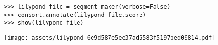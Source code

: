 \begin{comment}
<abjad>[stylesheet=../consort.ily]
lilypond_file = segment_maker(verbose=False)
consort.annotate(lilypond_file.score)
show(lilypond_file)
</abjad>
\end{comment}

\begin{singlespacing}
\vspace{-0.5\baselineskip}
\begin{lstlisting}
>>> lilypond_file = segment_maker(verbose=False)
>>> consort.annotate(lilypond_file.score)
>>> show(lilypond_file)
\end{lstlisting}
\noindent\texttt{[image: assets/lilypond-6e9d587e5ee37ad6583f5197bed09814.pdf]}
\end{singlespacing}
